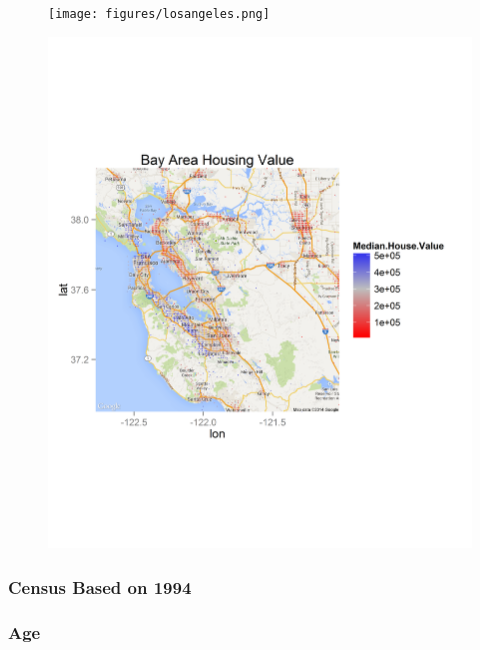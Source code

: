 \documentclass{beamer}
\begin{document}
\begin{frame}
	\begin{figure}
 \texttt{[image: figures/losangeles.png]}
\end{figure}
\end{frame}

\begin{frame}
	\begin{figure}
 \includegraphics[scale=0.3]{figures/bayarea.png}
\end{figure}
\end{frame}




\begin{frame}
\frametitle{Census Based on 1994}
\end{frame}

\begin{frame}
\frametitle{Age}
\end{frame}
\end{document}

